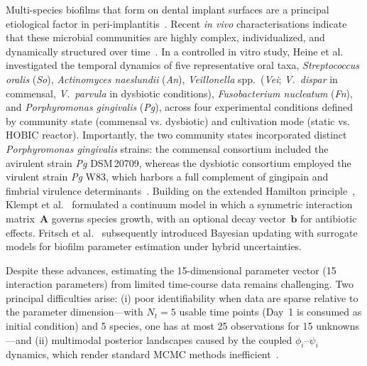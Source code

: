 \documentclass[11pt,a4paper]{article}
\begin{document}
Multi-species biofilms that form on dental implant surfaces are a principal etiological factor in peri-implantitis~\cite{Kolenbrander2010OralMultispecies, Marsh2003Dental}. Recent \textit{in vivo} characterisations indicate that these microbial communities are highly complex, individualized, and dynamically structured over time~\cite{dieckow2024structure, cui2025microbial}.
In a controlled in vitro study, Heine et al.~\cite{heine2025influence} investigated the temporal dynamics of five representative oral taxa, \textit{Streptococcus oralis} (\textit{So}), \textit{Actinomyces naeslundii} (\textit{An}), \textit{Veillonella} spp.\ (\textit{Vei}; \textit{V.~dispar} in commensal, \textit{V.~parvula} in dysbiotic conditions), \textit{Fusobacterium nucleatum} (\textit{Fn}), and \textit{Porphyromonas gingivalis} (\textit{Pg}), across four experimental conditions defined by community state (commensal vs. dysbiotic) and cultivation mode (static vs. HOBIC reactor).
Importantly, the two community states incorporated distinct \textit{Porphyromonas gingivalis} strains: the commensal consortium included the avirulent strain \textit{Pg} DSM\,20709, whereas the dysbiotic consortium employed the virulent strain \textit{Pg} W83, which harbors a full complement of gingipain and fimbrial virulence determinants~\cite{heine2025influence}.
Building on the extended Hamilton principle~\cite{JunkerBalzani2021ExtendedHamilton}, Klempt et al.~\cite{Klempt2025ContinuumBiofilm} formulated a continuum model in which a symmetric interaction matrix~$\mathbf{A}$ governs species growth, with an optional decay vector~$\mathbf{b}$ for antibiotic effects.
Fritsch et al.~\cite{Fritsch2025BayesianMicrofilms} subsequently introduced Bayesian updating with surrogate models for biofilm parameter estimation under hybrid uncertainties.

Despite these advances, estimating the 15-dimensional parameter vector (15 interaction parameters) from limited time-course data remains challenging.
Two principal difficulties arise: (i) poor identifiability when data are sparse relative to the parameter dimension---with $N_t=5$ usable time points (Day~1 is consumed as initial condition) and 5 species, one has at most 25 observations for 15 unknowns---and (ii) multimodal posterior landscapes caused by the coupled $\phi_i$--$\psi_i$ dynamics, which render standard MCMC methods inefficient~\cite{RobertCasella2004MonteCarlo}.
\end{document}
